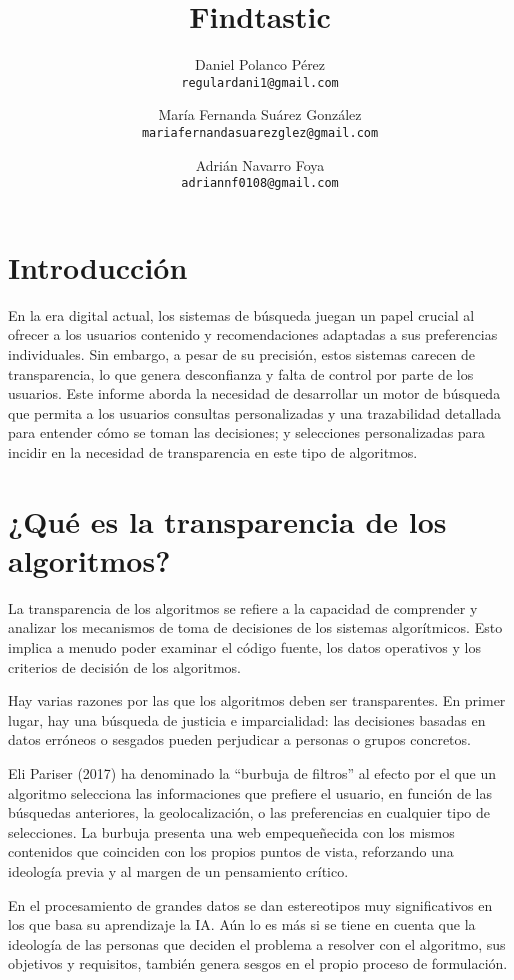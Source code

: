 \documentclass{article}
\title{Findtastic}
\author{
    Daniel Polanco Pérez \\
    \texttt{regulardani1@gmail.com} \\
    \and
    María Fernanda Suárez González \\
    \texttt{mariafernandasuarezglez@gmail.com} \\
    \and
    Adrián Navarro Foya \\
    \texttt{adriannf0108@gmail.com}
}
\begin{document}
\maketitle

\section*{Introducción}
En la era digital actual, los sistemas de búsqueda juegan un papel crucial al ofrecer a los usuarios contenido y recomendaciones adaptadas a sus preferencias individuales. Sin embargo, a pesar de su precisión, estos sistemas carecen de transparencia, lo que genera desconfianza y falta de control por parte de los usuarios. Este informe aborda la necesidad de desarrollar un motor de búsqueda que permita a los usuarios consultas personalizadas y una trazabilidad detallada para entender cómo se toman las decisiones; y selecciones personalizadas para incidir en la necesidad de transparencia en este tipo de algoritmos.

\section*{¿Qué es la transparencia de los algoritmos?}
La transparencia de los algoritmos se refiere a la capacidad de comprender y analizar los mecanismos de toma de decisiones de los sistemas algorítmicos. Esto implica a menudo poder examinar el código fuente, los datos operativos y los criterios de decisión de los algoritmos.

Hay varias razones por las que los algoritmos deben ser transparentes. En primer lugar, hay una búsqueda de justicia e imparcialidad: las decisiones basadas en datos erróneos o sesgados pueden perjudicar a personas o grupos concretos.

Eli Pariser (2017) ha denominado la “burbuja de filtros” al efecto por el que un algoritmo selecciona las informaciones que prefiere el usuario, en función de las búsquedas anteriores, la geolocalización, o las preferencias en cualquier tipo de selecciones. La burbuja presenta una web empequeñecida con los mismos contenidos que coinciden con los propios puntos de vista, reforzando una ideología previa y al margen de un pensamiento crítico.

En el procesamiento de grandes datos se dan estereotipos muy significativos en los que basa su aprendizaje la IA. Aún lo es más si se tiene en cuenta que la ideología de las personas que deciden el problema a resolver con el algoritmo, sus objetivos y requisitos, también genera sesgos en el propio proceso de formulación.
\end{document}
